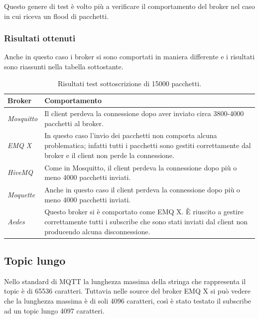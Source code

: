 \documentclass[binding=0.6cm,TFA]{sapthesis}
\begin{document}
\begin{large}
Questo genere di test è volto più a verificare il comportamento del broker nel caso in cui riceva un flood di pacchetti.

\subsubsection{Risultati ottenuti}
Anche in questo caso i broker si sono comportati in maniera differente e i risultati sono riassunti nella tabella sottostante.
\begin{table}[h]
\caption{Risultati test sottoscrizione di 15000 pacchetti.}
\label{tab:results15ksub}
\begin{tabular}{lp{}}
\toprule
\textbf{Broker} & \textbf{Comportamento} \\
\midrule
\textit{Mosquitto} & Il client perdeva la connessione dopo aver inviato circa 3800-4000 pacchetti al broker. \\
\textit{EMQ X} & In questo caso l'invio dei pacchetti non comporta alcuna problematica; infatti tutti i pacchetti sono gestiti correttamente dal broker e il client non perde la connessione. \\
\textit{HiveMQ} & Come in Mosquitto, il client perdeva la connessione dopo più o meno 4000 pacchetti inviati. \\
\textit{Moquette} & Anche in questo caso il client perdeva la connessione dopo più o meno 4000 pacchetti inviati.\\
\textit{Aedes} & Questo broker si è comportato come EMQ X. È riuscito a gestire correttamente tutti i subscribe che sono stati inviati dal client non producendo alcuna disconnessione. \\
\bottomrule
\end{tabular}
\end{table}

\subsection{Topic lungo}
Nello standard di MQTT la lunghezza massima della stringa che rappresenta il topic è di 65536 caratteri. Tuttavia nelle source del broker EMQ X \cite{emqxsource} si può vedere che la lunghezza massima è di soli 4096 caratteri, così è stato testato il subscribe ad un topic lungo 4097 caratteri.


\end{large}
\end{document}
